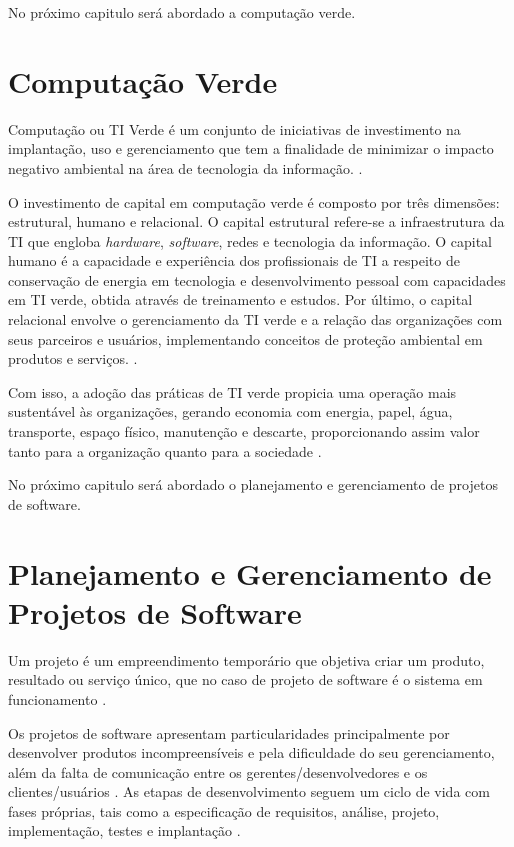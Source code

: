 No próximo capitulo será abordado a computação verde.

\section{Computação Verde}

Computação ou TI Verde é um conjunto de iniciativas de investimento na implantação, uso e gerenciamento que tem a finalidade de minimizar o impacto negativo ambiental na área de tecnologia da informação. \cite{CQP_MMD_2020}.

O investimento de capital em computação verde é composto por três dimensões: estrutural, humano e relacional.
O capital estrutural refere-se a infraestrutura da TI que engloba \textit{hardware}, \textit{software}, redes e tecnologia da informação. O capital humano é a capacidade e experiência dos profissionais de TI a respeito de conservação de energia em tecnologia e desenvolvimento pessoal com capacidades em TI verde, obtida através de treinamento e estudos. Por último, o capital relacional envolve o gerenciamento da TI verde e a relação das organizações com seus parceiros e usuários, implementando conceitos de proteção ambiental em produtos e serviços. \cite{CQP_MMD_2020}.

Com isso, a adoção das práticas de TI verde propicia uma operação mais sustentável às organizações, gerando economia com energia, papel, água, transporte, espaço físico, manutenção e descarte, proporcionando assim valor tanto para a organização quanto para a sociedade \cite{TallesMoura2017}.

No próximo capitulo será abordado o planejamento e gerenciamento de projetos de software.

\section{Planejamento e Gerenciamento de Projetos de Software}

Um projeto é um empreendimento temporário que objetiva criar um produto, resultado ou serviço único, que no caso de projeto de software é o sistema em funcionamento \cite{Julia_Mara_2018}.

Os projetos de software apresentam particularidades principalmente por desenvolver produtos incompreensíveis e pela dificuldade do seu gerenciamento, além da falta de comunicação entre os gerentes/desenvolvedores e os clientes/usuários \cite{Prado1999}. As etapas de desenvolvimento seguem um ciclo de vida com fases próprias, tais como a especificação de requisitos, análise, projeto, implementação, testes e implantação \cite{Ralf_Teresa_Erica2018}.

